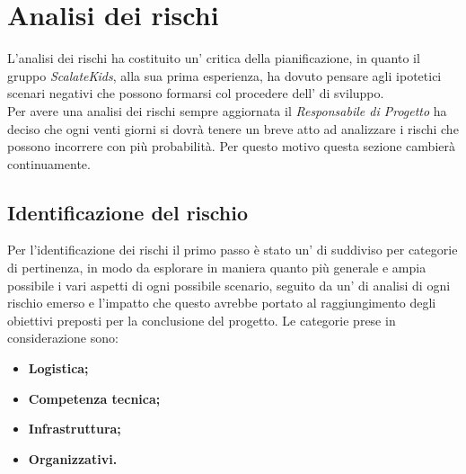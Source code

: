 \documentclass{scalatekids-article}
\begin{document}
\section{Analisi dei rischi}
L'analisi dei rischi ha costituito un' critica della pianificazione, in
quanto il gruppo \textit{ScalateKids}, alla sua prima esperienza, ha dovuto pensare agli ipotetici
scenari negativi che possono formarsi col procedere dell' di sviluppo.\\
Per avere una analisi dei rischi sempre aggiornata il \textit{Responsabile di Progetto} ha deciso che ogni venti giorni si dovrà tenere un breve  atto ad analizzare i rischi che possono incorrere con più probabilità. Per questo motivo questa sezione cambierà continuamente.\\
\subsection{Identificazione del rischio}
Per l'identificazione dei rischi il primo passo è stato un' di
 suddiviso per categorie di pertinenza, in modo da esplorare
in maniera quanto più generale e ampia possibile i vari aspetti di ogni
possibile scenario, seguito da un' di analisi di ogni rischio emerso e
l'impatto che questo avrebbe portato al raggiungimento degli obiettivi preposti
per la conclusione del progetto. Le categorie prese in considerazione sono:
\begin{itemize}
\item\textbf{Logistica;}
\item\textbf{Competenza tecnica;}
\item\textbf{Infrastruttura;}
\item\textbf{Organizzativi.}
\end{itemize}
\end{document}
